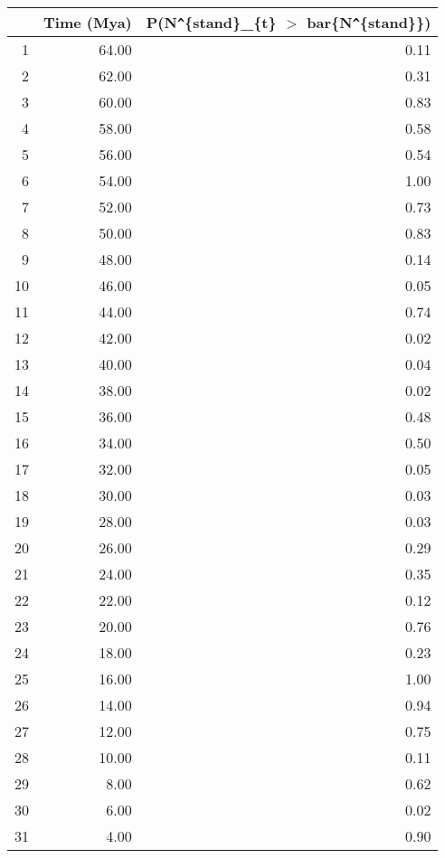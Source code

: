 \begin{table}[ht]
\centering
\begin{tabular}{rrr}
  \hline
 & Time (Mya) & P(N\verb|^|\{stand\}\_\{t\} $>$ bar\{N\verb|^|\{stand\}\}) \\ 
  \hline
1 & 64.00 & 0.11 \\ 
  2 & 62.00 & 0.31 \\ 
  3 & 60.00 & 0.83 \\ 
  4 & 58.00 & 0.58 \\ 
  5 & 56.00 & 0.54 \\ 
  6 & 54.00 & 1.00 \\ 
  7 & 52.00 & 0.73 \\ 
  8 & 50.00 & 0.83 \\ 
  9 & 48.00 & 0.14 \\ 
  10 & 46.00 & 0.05 \\ 
  11 & 44.00 & 0.74 \\ 
  12 & 42.00 & 0.02 \\ 
  13 & 40.00 & 0.04 \\ 
  14 & 38.00 & 0.02 \\ 
  15 & 36.00 & 0.48 \\ 
  16 & 34.00 & 0.50 \\ 
  17 & 32.00 & 0.05 \\ 
  18 & 30.00 & 0.03 \\ 
  19 & 28.00 & 0.03 \\ 
  20 & 26.00 & 0.29 \\ 
  21 & 24.00 & 0.35 \\ 
  22 & 22.00 & 0.12 \\ 
  23 & 20.00 & 0.76 \\ 
  24 & 18.00 & 0.23 \\ 
  25 & 16.00 & 1.00 \\ 
  26 & 14.00 & 0.94 \\ 
  27 & 12.00 & 0.75 \\ 
  28 & 10.00 & 0.11 \\ 
  29 & 8.00 & 0.62 \\ 
  30 & 6.00 & 0.02 \\ 
  31 & 4.00 & 0.90 \\ 
   \hline
\end{tabular}
\label{tab:div_peak}
\end{table}
